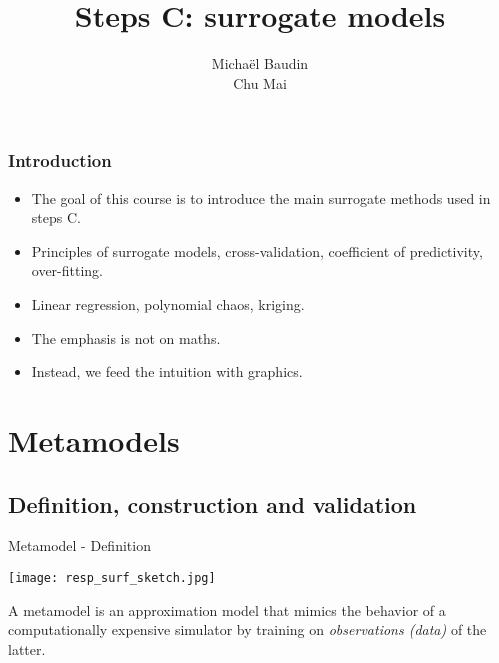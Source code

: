 \documentclass{beamer}
\title{Steps C: surrogate models}
\author[M. Baudin]{Michaël Baudin\\Chu Mai}
\begin{document}
\frame{\titlepage}


\begin{frame}
\frametitle{Introduction}

\begin{itemize}
\item The goal of this course is to introduce the main surrogate methods used in 
steps C. 

\item Principles of surrogate models, cross-validation, coefficient of predictivity, over-fitting.

\item Linear regression, polynomial chaos, kriging.

\item The emphasis is not on maths. 

\item Instead, we feed the intuition with graphics. 
\end{itemize}

\end{frame}


\begin{frame}
\begin{multicols}{2}
  {\tableofcontents[hideallsubsections]}
\end{multicols}
\end{frame}


\section{Metamodels}

\subsection{Definition, construction and validation}

\begin{frame}[t]{Metamodel - Definition}

\begin{center}
 \texttt{[image: resp\_surf\_sketch.jpg]}
\end{center}

A metamodel is an approximation model that mimics the behavior of a computationally expensive simulator by training on \emph{observations (data)} of the latter.

\end{frame}
\end{document}

